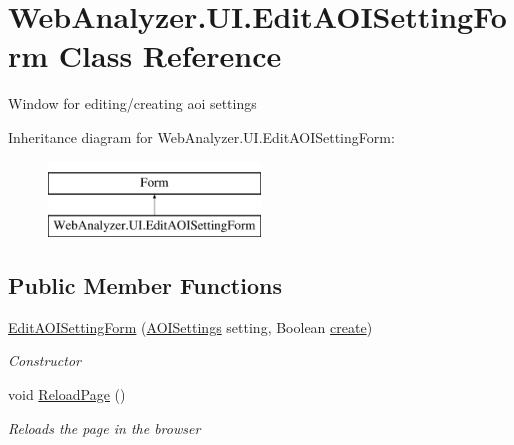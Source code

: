 \hypertarget{class_web_analyzer_1_1_u_i_1_1_edit_a_o_i_setting_form}{}\section{Web\+Analyzer.\+U\+I.\+Edit\+A\+O\+I\+Setting\+Form Class Reference}
\label{class_web_analyzer_1_1_u_i_1_1_edit_a_o_i_setting_form}


Window for editing/creating aoi settings  


Inheritance diagram for Web\+Analyzer.\+U\+I.\+Edit\+A\+O\+I\+Setting\+Form\+:\begin{figure}[H]
\begin{center}
\leavevmode
\includegraphics[height=2.000000cm]{class_web_analyzer_1_1_u_i_1_1_edit_a_o_i_setting_form}
\end{center}
\end{figure}
\subsection*{Public Member Functions}
\begin{DoxyCompactItemize}
\item 
\hyperlink{class_web_analyzer_1_1_u_i_1_1_edit_a_o_i_setting_form_abd1be33a9bb08df8876f4c6058ccfda6}{Edit\+A\+O\+I\+Setting\+Form} (\hyperlink{class_web_analyzer_1_1_models_1_1_settings_model_1_1_a_o_i_settings}{A\+O\+I\+Settings} setting, Boolean \hyperlink{_u_i_2_h_t_m_l_resources_2js_2lib_2underscore_8min_8js_a8bd5981157799459d39a59e8c4a0de04}{create})
\begin{DoxyCompactList}\small\item\em Constructor \end{DoxyCompactList}\item 
void \hyperlink{class_web_analyzer_1_1_u_i_1_1_edit_a_o_i_setting_form_a292d49b250e34569220541736df0659c}{Reload\+Page} ()
\begin{DoxyCompactList}\small\item\em Reloads the page in the browser \end{DoxyCompactList}\end{DoxyCompactItemize}
